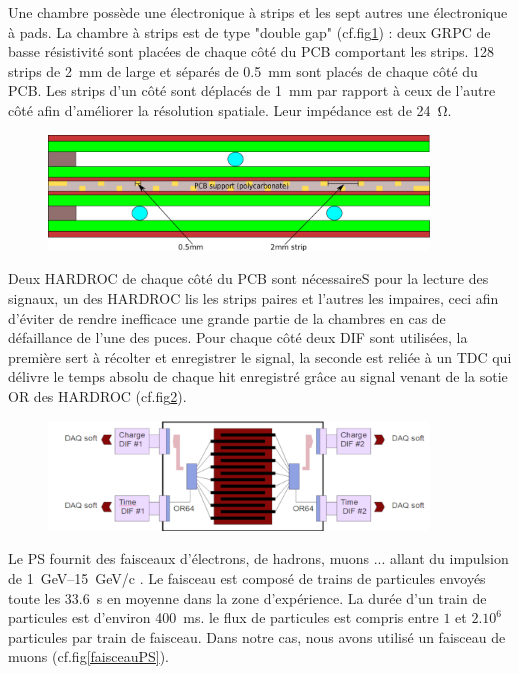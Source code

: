 Une chambre possède une électronique à strips et les sept autres une électronique à pads. La chambre à strips est de type "double gap" (cf.fig\ref{DoubleGap}) : deux GRPC de basse résistivité sont placées de chaque côté du PCB comportant les strips. \num{128} strips de \SI{2}{\milli\meter} de large et séparés de \SI{0.5}{\milli\meter} sont placés de chaque côté du PCB. Les strips d'un côté sont déplacés de \SI{1}{\milli\meter} par rapport à ceux de l'autre côté afin d'améliorer la résolution spatiale. Leur impédance est de \SI{24}{\ohm}. 

\begin{figure}[ht!]
	\centering
	\includegraphics[width=0.9\textwidth]{GLA/DoubleGap.png}
	\label{DoubleGap}
\end{figure}

Deux HARDROC de chaque côté du PCB sont nécessaireS pour la lecture des signaux, un des HARDROC lis les strips paires et l'autres les impaires, ceci afin d'éviter de rendre inefficace une grande partie de la chambres en cas de défaillance de l'une des puces. Pour chaque côté deux DIF sont utilisées, la première sert à récolter et enregistrer le signal, la seconde est reliée à un TDC qui délivre le temps absolu de chaque hit enregistré grâce au signal venant de la sotie OR des HARDROC (cf.fig\ref{SchemePS}).

\begin{figure}[ht!]
	\centering
	\includegraphics[width=0.9\textwidth]{GLA/SchemePS.png}
	\label{SchemePS}
\end{figure}

Le PS fournit des faisceaux d'électrons, de hadrons, muons ... allant du impulsion de \SIrange{1}{15}{\giga\eV}/c . Le faisceau est composé de trains de particules envoyés toute les \SI{33.6}{\second} en moyenne dans la zone d'expérience. La durée d'un train de particules est d'environ \SI{400}{\milli\second}. le flux de particules est compris entre $1$ et $2.10^{6}$ particules par train de faisceau. Dans notre cas, nous avons utilisé un faisceau de muons (cf.fig\ref{faisceauPS}).
 
